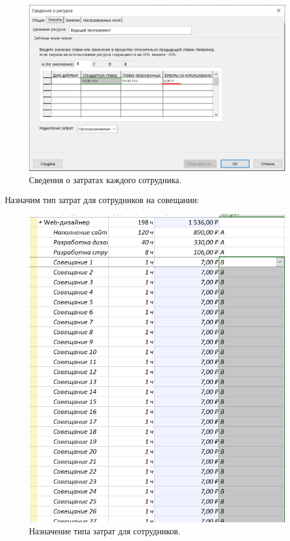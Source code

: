 \documentclass[a4paper,14pt]{extreport} %
\begin{document}
\begin{enumerate}
\begin{figure}[H]
  \centering
  \caption{Сведения о затратах каждого сотрудника. }
  \includegraphics[scale=0.9]{9}
\end{figure}

Назначим тип затрат для сотрудников на совещании:

\begin{figure}[H]
  \centering
  \caption{Назначение типа затрат для сотрудников. }
  \includegraphics[scale=0.9]{10}
\end{figure}


\end{enumerate}
\end{document}
